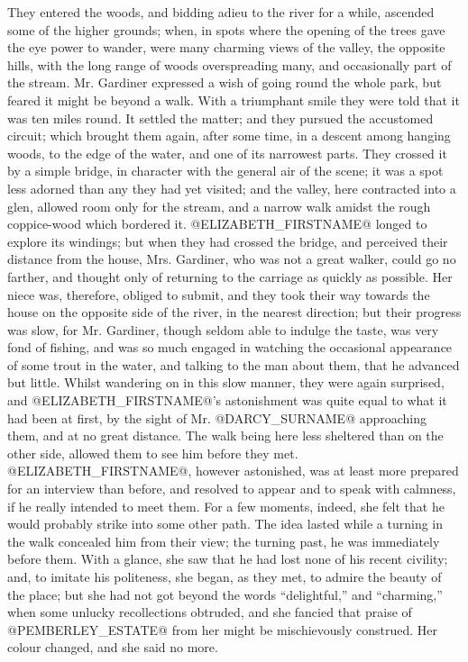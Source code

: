 They entered the woods, and bidding adieu to the river for a while,
ascended some of the higher grounds; when, in spots where the opening of
the trees gave the eye power to wander, were many charming views of the
valley, the opposite hills, with the long range of woods overspreading
many, and occasionally part of the stream. Mr. Gardiner expressed a wish
of going round the whole park, but feared it might be beyond a walk.
With a triumphant smile they were told that it was ten miles round.
It settled the matter; and they pursued the accustomed circuit; which
brought them again, after some time, in a descent among hanging woods,
to the edge of the water, and one of its narrowest parts. They crossed
it by a simple bridge, in character with the general air of the scene;
it was a spot less adorned than any they had yet visited; and the
valley, here contracted into a glen, allowed room only for the stream,
and a narrow walk amidst the rough coppice-wood which bordered it.
@ELIZABETH_FIRSTNAME@ longed to explore its windings; but when they had crossed the
bridge, and perceived their distance from the house, Mrs. Gardiner,
who was not a great walker, could go no farther, and thought only
of returning to the carriage as quickly as possible. Her niece was,
therefore, obliged to submit, and they took their way towards the house
on the opposite side of the river, in the nearest direction; but their
progress was slow, for Mr. Gardiner, though seldom able to indulge the
taste, was very fond of fishing, and was so much engaged in watching the
occasional appearance of some trout in the water, and talking to the
man about them, that he advanced but little. Whilst wandering on in this
slow manner, they were again surprised, and @ELIZABETH_FIRSTNAME@'s astonishment
was quite equal to what it had been at first, by the sight of Mr. @DARCY_SURNAME@
approaching them, and at no great distance. The walk being here
less sheltered than on the other side, allowed them to see him before
they met. @ELIZABETH_FIRSTNAME@, however astonished, was at least more prepared
for an interview than before, and resolved to appear and to speak with
calmness, if he really intended to meet them. For a few moments, indeed,
she felt that he would probably strike into some other path. The idea
lasted while a turning in the walk concealed him from their view; the
turning past, he was immediately before them. With a glance, she saw
that he had lost none of his recent civility; and, to imitate his
politeness, she began, as they met, to admire the beauty of the place;
but she had not got beyond the words ``delightful,'' and ``charming,'' when
some unlucky recollections obtruded, and she fancied that praise of
@PEMBERLEY_ESTATE@ from her might be mischievously construed. Her colour changed,
and she said no more.

